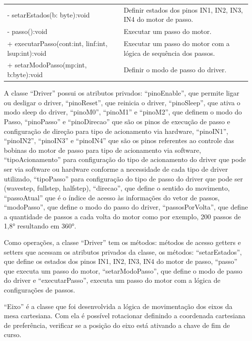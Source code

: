 \begin{table}[H]
\begin{tabular}{p{8cm}p{6cm}}
        - setarEstados(b: byte):void & Definir estados dos pinos IN1, IN2, IN3, IN4 do motor de passo.\\
        - passo():void & Executar um passo do motor.\\
        + executarPasso(cont:int, linf:int, lsup:int):void & Executar um passo do motor com a lógica de sequência dos passos.\\
        + setarModoPasso(mp:int, b:byte):void & Definir o modo de passo do driver.\\
        \hline       
    \end{tabular}
    \label{tab:classedriver}
\end{table}

A classe “Driver” possui os atributos privados: “pinoEnable”, que permite ligar ou desligar o driver, 
“pinoReset”, que reinicia o driver, “pinoSleep”, que ativa o modo sleep do driver, “pinoM0”, “pinoM1” 
e “pinoM2”, que definem o modo do Passo, “pinoPasso” e “pinoDirecao” que são os pinos de execução de 
passo e configuração de direção para tipo de acionamento via hardware, “pinoIN1”, “pinoIN2”, “pinoIN3” 
e “pinoIN4” que são os pinos referentes ao controle das bobinas do motor de passo para tipo de acionamento 
via software, “tipoAcionamento” para configuração do tipo de acionamento do driver que pode ser via software 
ou hardware conforme a necessidade de cada tipo de driver utilizado, “tipoPasso” para configuração do tipo 
de passo do driver que pode ser (wavestep, fullstep, halfstep), “direcao”, que define o sentido do movimento, 
“passoAtual” que é o índice de acesso às informações do vetor de passos, “modoPasso”, que define o modo do 
passo do driver, “passosPorVolta”, que define a quantidade de passos a cada volta do motor como por exemplo, 
200 passos de 1,8° resultando em 360°. 

Como operações, a classe “Driver” tem os métodos: métodos de acesso getters e setters que acessam os 
atributos privados da classe, os métodos: “setarEstados”, que define os estados dos pinos IN1, IN2, IN3, 
IN4 do motor de passo, “passo” que executa um passo do motor, “setarModoPasso”, que define o modo de passo 
do driver e “executarPasso”, executa um passo do motor com a lógica de configurações de passos.

“Eixo” é a classe que foi desenvolvida a lógica de movimentação dos eixos da mesa cartesiana. Com ela é 
possível rotacionar definindo a coordenada cartesiana de preferência, verificar se a posição do eixo 
está ativando a chave de fim de curso.

